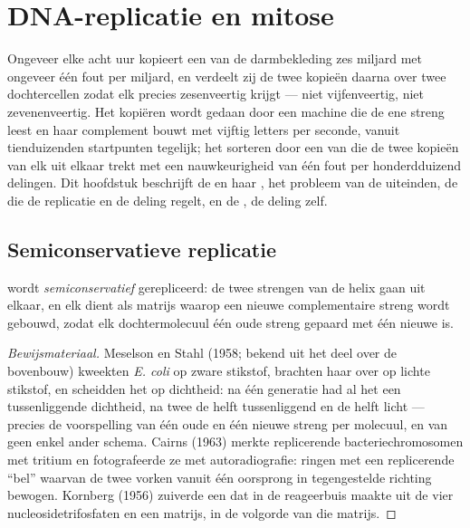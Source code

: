 \chapter{DNA-replicatie en mitose}\label{ch:b1:replication-mitosis}

Ongeveer elke acht uur kopieert een  van de darmbekleding zes miljard
 met ongeveer één fout per miljard, en verdeelt zij de twee kopieën
daarna over twee dochtercellen zodat elk precies zesenveertig  krijgt
--- niet vijfenveertig, niet zevenenveertig. Het kopiëren wordt gedaan door een
machine die de ene streng leest en haar complement bouwt met vijftig letters per
seconde, vanuit tienduizenden startpunten tegelijk; het sorteren door een
 van  die de twee kopieën van elk  uit elkaar
trekt met een nauwkeurigheid van één fout per honderdduizend delingen. Dit
hoofdstuk beschrijft de  en haar , het probleem van de
uiteinden, de  die de replicatie en de deling regelt, en de , de
deling zelf.

\section{Semiconservatieve replicatie}

\begin{proposition}\label{prop:b1:replication-mitosis:semiconservative}
 wordt \emph{semiconservatief} gerepliceerd: de twee strengen van de helix gaan
uit elkaar, en elk dient als matrijs waarop een nieuwe complementaire streng wordt
gebouwd, zodat elk dochtermolecuul één oude streng gepaard met één nieuwe is.
\end{proposition}
\begin{proof}[Bewijsmateriaal]
Meselson en Stahl (1958; bekend uit het deel over de bovenbouw) kweekten
\emph{E. coli} op zware stikstof, brachten haar over op lichte stikstof, en
scheidden het  op dichtheid: na één generatie had al het  een tussenliggende
dichtheid, na twee de helft tussenliggend en de helft licht --- precies de
voorspelling van één oude en één nieuwe streng per molecuul, en van geen enkel
ander schema. Cairns (1963) merkte replicerende bacteriechromosomen met tritium en
fotografeerde ze met autoradiografie: ringen met een replicerende ``bel'' waarvan
de twee vorken vanuit één oorsprong in tegengestelde richting bewogen. Kornberg
(1956) zuiverde een  dat in de reageerbuis  maakte uit de vier
nucleosidetrifosfaten en een matrijs, in de volgorde van die matrijs.
\end{proof}

